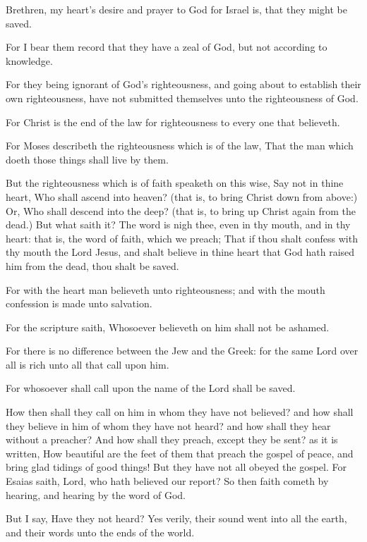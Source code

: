 \Chapter
\Verse Brethren, my heart's desire and prayer to God for Israel is, that they might be saved.

\Verse For I bear them record that they have a zeal of God, but not according to knowledge.

\Verse For they being ignorant of God's righteousness, and going about to establish their own righteousness, have not submitted themselves unto the righteousness of God.

\Verse For Christ is the end of the law for righteousness to every one that believeth.

\Verse For Moses describeth the righteousness which is of the law, That the man which doeth those things shall live by them.

\Verse But the righteousness which is of faith speaketh on this wise, Say not in thine heart, Who shall ascend into heaven? (that is, to bring Christ down from above:) \Verse Or, Who shall descend into the deep? (that is, to bring up Christ again from the dead.)  \Verse But what saith it? The word is nigh thee, even in thy mouth, and in thy heart: that is, the word of faith, which we preach; \Verse That if thou shalt confess with thy mouth the Lord Jesus, and shalt believe in thine heart that God hath raised him from the dead, thou shalt be saved.

\Verse For with the heart man believeth unto righteousness; and with the mouth confession is made unto salvation.

\Verse For the scripture saith, Whosoever believeth on him shall not be ashamed.

\Verse For there is no difference between the Jew and the Greek: for the same Lord over all is rich unto all that call upon him.

\Verse For whosoever shall call upon the name of the Lord shall be saved.

\Verse How then shall they call on him in whom they have not believed?  and how shall they believe in him of whom they have not heard? and how shall they hear without a preacher?  \Verse And how shall they preach, except they be sent? as it is written, How beautiful are the feet of them that preach the gospel of peace, and bring glad tidings of good things!  \Verse But they have not all obeyed the gospel. For Esaias saith, Lord, who hath believed our report?  \Verse So then faith cometh by hearing, and hearing by the word of God.

\Verse But I say, Have they not heard? Yes verily, their sound went into all the earth, and their words unto the ends of the world.


